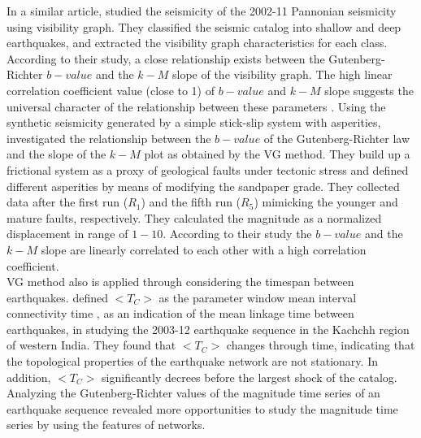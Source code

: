 In a similar article, \citet{Telesca2014} studied the seismicity of the 2002-11 Pannonian seismicity using visibility graph. They classified the seismic catalog into shallow and deep earthquakes, and extracted the visibility graph characteristics for each class. According to their study, a close relationship exists between the Gutenberg-Richter $b-value$ and the $k-M$ slope of the visibility graph. The high linear correlation coefficient value (close to 1) of $b-value$ and $k-M$  slope suggests the universal character of the relationship between these parameters \citep{Telesca2014}.  Using the synthetic seismicity generated by a simple stick-slip system with asperities, \citet{Telesca2014-pone} investigated the relationship between the $b-value$ of the Gutenberg-Richter law and the slope of the $k-M$ plot as obtained by the VG method. They build up a frictional system as a proxy of geological faults under tectonic stress and defined different asperities by means of modifying the sandpaper grade. They collected data after the first run ($R_1$) and the fifth run ($R_5$) mimicking the younger and mature faults, respectively. They calculated the magnitude as a normalized displacement in range of $1-10$. According to their study the $b-value$ and the $k-M$ slope are linearly correlated to each other with a high correlation coefficient.\\
\noindent
VG method also is applied through considering the timespan between earthquakes. \citet{Telesca2016}   defined    $<T_C>$  as the parameter window mean interval connectivity time ,  as an indication of the mean linkage time between earthquakes, in studying the 2003-12 earthquake sequence in the Kachchh region of western India. They found that  $<T_C>$  changes through time, indicating that the topological properties of the earthquake network are not stationary. In addition,  $<T_C>$  significantly decrees before the largest shock of the catalog. Analyzing the Gutenberg-Richter values of  the magnitude time series of an earthquake sequence revealed more opportunities to study the magnitude time series by using the features of networks. 
\noindent
